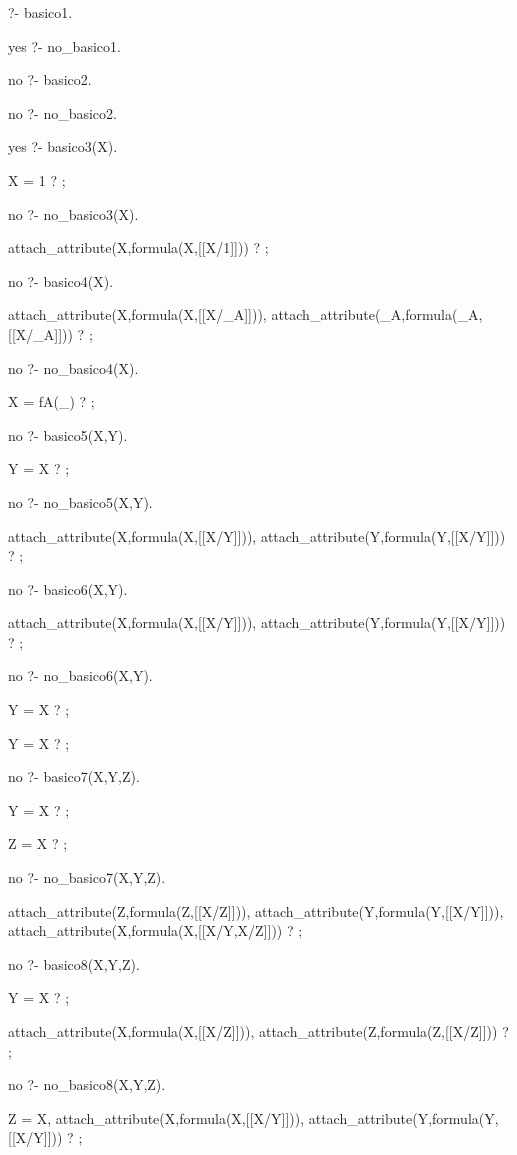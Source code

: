 

?- basico1.

yes
?- no_basico1.

no
?- basico2.

no
?- no_basico2.

yes
?- basico3(X).

X = 1 ? ;

no
?- no_basico3(X).

attach_attribute(X,formula(X,[[X/1]])) ? ;

no
?- basico4(X).

attach_attribute(X,formula(X,[[X/_A]])),
attach_attribute(_A,formula(_A,[[X/_A]])) ? ;

no
?- no_basico4(X).

X = fA(_) ? ;

no
?- basico5(X,Y).

Y = X ? ;

no
?- no_basico5(X,Y).

attach_attribute(X,formula(X,[[X/Y]])),
attach_attribute(Y,formula(Y,[[X/Y]])) ? ;

no
?- basico6(X,Y).

attach_attribute(X,formula(X,[[X/Y]])),
attach_attribute(Y,formula(Y,[[X/Y]])) ? ;

no
?- no_basico6(X,Y).

Y = X ? ;

Y = X ? ;

no
?- basico7(X,Y,Z).

Y = X ? ;

Z = X ? ;

no
?- no_basico7(X,Y,Z).

attach_attribute(Z,formula(Z,[[X/Z]])),
attach_attribute(Y,formula(Y,[[X/Y]])),
attach_attribute(X,formula(X,[[X/Y,X/Z]])) ? ;

no
?- basico8(X,Y,Z).

Y = X ? ;

attach_attribute(X,formula(X,[[X/Z]])),
attach_attribute(Z,formula(Z,[[X/Z]])) ? ;

no
?- no_basico8(X,Y,Z).

Z = X,
attach_attribute(X,formula(X,[[X/Y]])),
attach_attribute(Y,formula(Y,[[X/Y]])) ? ;

